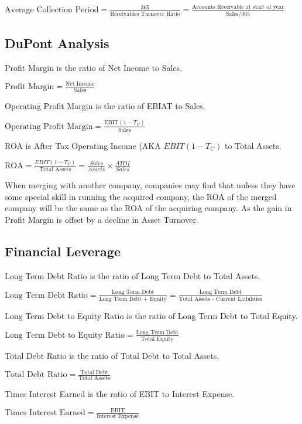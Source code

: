 $\text{Average Collection Period} = \frac{365}{\text{Receivables Turnover Ratio}} = \frac{\text{Accounts Receivable at start of year}}{\text{Sales}/ 365}$

\subsection{DuPont Analysis}

Profit Margin is the ratio of Net Income to Sales.

$\text{Profit Margin} = \frac{\text{Net Income}}{\text{Sales}}$

Operating Profit Margin is the ratio of EBIAT to Sales.

$\text{Operating Profit Margin} = \frac{\text{EBIT}(1-T_C)}{\text{Sales}}$

ROA is After Tax Operating Income (AKA $EBIT(1-T_C)$ to Total Assets.

$\text{ROA} = \frac{EBIT(1-T_C)}{\text{Total Assets}} = \frac{Sales}{Assets}\times \frac{ATOI}{Sales}$

When merging with another company, companies may find that unless they have some special skill
in running the acquired company, the ROA of the merged company will be the same as the ROA of the acquiring company. As the gain in Profit Margin is offset by a decline in Asset Turnover.


\subsection{Financial Leverage}

Long Term Debt Ratio is the ratio of Long Term Debt to Total Assets.

$\text{Long Term Debt Ratio} = \frac{\text{Long Term Debt}}{\text{Long Term Debt + Equity} } = \frac{\text{Long Term Debt}}{\text{Total Assets - Current Liabilities}}$

Long Term Debt to Equity Ratio is the ratio of Long Term Debt to Total Equity.

$\text{Long Term Debt to Equity Ratio} = \frac{\text{Long Term Debt}}{\text{Total Equity}}$

Total Debt Ratio is the ratio of Total Debt to Total Assets.

$\text{Total Debt Ratio} = \frac{\text{Total Debt}}{\text{Total Assets}}$

Times Interest Earned is the ratio of EBIT to Interest Expense.

$\text{Times Interest Earned} = \frac{\text{EBIT}}{\text{Interest Expense}}$

